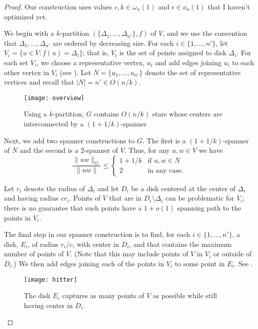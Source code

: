 \documentclass{patmorin}
\begin{document}
\begin{proof}
  Our construction uses values $c,k\in\omega_n(1)$ and $\epsilon\in
  o_n(1)$ that I haven't optimized yet.

  We begin with a $k$-partition $(\{\Delta_1,\ldots,\Delta_{n'}\},f)$
  of $V$, and we use the convention that $\Delta_1,\ldots,\Delta_{n'}$
  are ordered by decreasing size.  For each $i\in \{1,\ldots,n'\}$,
  let $V_i=\{u\in V : f(u)=\Delta_i\}$; that is, $V_i$ is the set of
  points assigned to disk $\Delta_i$.  For each set $V_i$, we choose a
  representative vertex, $u_i$ and add edges joining $u_i$ to each other
  vertex in $V_i$ (see ). Let $N=\{u_1,\ldots,u_{n'}\}$
  denote the set of representative vertices and recall that $|N|=n'\in
  O(n/k)$.
  
  \begin{figure}
    \begin{center} 
      \texttt{[image: overview]}
    \end{center} 
    \caption{Using a $k$-partition, $G$ contains $O(n/k)$ stars whose
      centers are interconnected by a $(1+1/k)$-spanner}
  \end{figure}

  Next, we add two spanner constructions to $G$.  The first is a
  $(1+1/k)$-spanner of $N$ and the second is a $2$-spanner of $V$.
  Thus, for any $u,w\in V$ we have
  \[
     \frac{\|uw\|_G}{\|uw\|} \le \begin{cases}
           1+1/k & \text{if $u,w\in N$} \\
           2 & \text{in any case.}
         \end{cases}
  \]
  
  Let $r_i$ denote the radius of $\Delta_i$ and let $D_i$ be a disk
  centered at the center of $\Delta_i$ and having radius $cr_i$.
  Points of $V$ that are in $D_i\setminus \Delta_i$ can be problematic
  for $V_i$; there is no guarantee that such points have a $1+o(1)$
  spanning path to the points in $V_i$.

  The final step in our spanner construction is to find, for each
  $i\in\{1,\ldots,n'\}$,  a disk, $E_i$, of radius $r_i/c$, with center
  in $D_i$, and that contains the maximum number of points of $V$.
  (Note that this may include points of $V$ in $V_i$ or outside of $D_i$.)
  We then add edges joining each of the points in $V_i$ to some point
  in $E_i$.  See .

  \begin{figure}
    \begin{center}
      \texttt{[image: hitter]}
    \end{center}
    \caption{The disk $E_i$ captures as many points of $V$ as possible
     while still having center in $D_i$.}
  \end{figure}


\end{proof}
\end{document}
